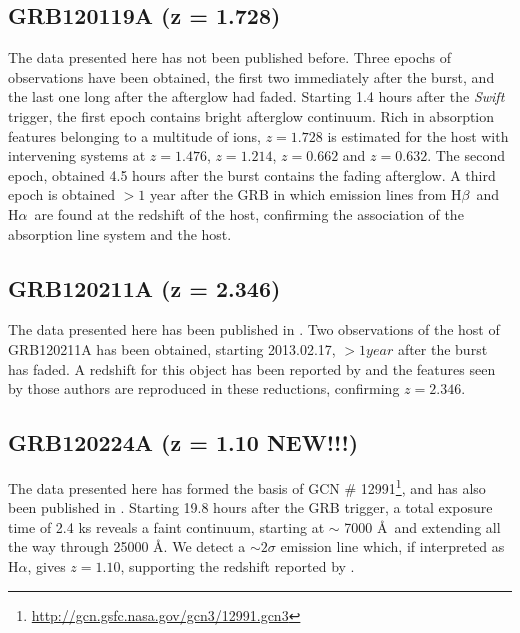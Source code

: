 \documentclass[iop, twocolappendix, numberedappendix, tighten, appendixfloats]{emulateapj}
\newcommand{\hb}{H$\beta$}
\newcommand{\ha}{H$\alpha$}
\begin{document}
	\subsection{GRB120119A (z = 1.728)}
	The data presented here has not been published before. Three epochs of
	observations have been obtained, the first two immediately after the burst, and
	the last one long after the afterglow had faded. Starting 1.4 hours after the
	\textit{Swift} trigger, the first epoch contains bright afterglow continuum.
	Rich in absorption features belonging to a multitude of ions, $z =	1.728$ is
	estimated for the host with intervening systems at $z =	1.476$, $z = 1.214$, $z
	= 0.662$ and $z = 0.632$. The second epoch, obtained 4.5 hours after the burst
	contains the fading afterglow. A third epoch is obtained $>1$ year after the
	GRB in which emission lines from \hb~and \ha~are found at the redshift of the
	host, confirming the association of the absorption line system and the host.
	
	\subsection{GRB120211A (z = 2.346)}
	The data presented here has been published in \citet{Kruhler2015}. Two
	observations of the host of GRB120211A has been obtained, starting 2013.02.17,
	$> 1 year$ after the burst has faded. A redshift for this object has been
	reported by \citet{Kruhler2015} and the features seen by those authors are
	reproduced in these reductions, confirming $z =	2.346$.

	\subsection{GRB120224A (z = 1.10 NEW!!!)}
	The data presented here has formed the basis of GCN \#
	12991\footnote{\url{http://gcn.gsfc.nasa.gov/gcn3/12991.gcn3}}, and has also
	been published in \citet{Kruhler2015}. Starting 19.8 hours after the GRB
	trigger, a total exposure time of 2.4 ks reveals a faint continuum, starting at
	$\sim$ 7000 \AA~and extending all the way through 25000 \AA. We detect a $\sim
	2 \sigma$ emission line which, if interpreted as \ha, gives $z = 1.10$,
	supporting the redshift reported by \citet{Kruhler2015}.
\end{document}
